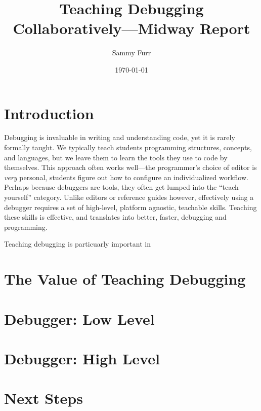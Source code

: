 \documentclass[12pt, twocolumn]{article}
\author{Sammy Furr}
\title{Teaching Debugging Collaboratively---Midway Report}
\date{\today}
\begin{document}
\begin{titlepage}
\maketitle
\end{titlepage}

\section{Introduction}

Debugging is invaluable in writing and understanding code, yet it is
rarely formally taught.  We typically teach students programming
structures, concepts, and languages, but we leave them to learn the
tools they use to code by themselves.  This approach often works
well---the programmer's choice of editor is \textit{very} personal,
students figure out how to configure an individualized workflow.
Perhaps because debuggers are tools, they often get lumped into the
``teach yourself'' category.  Unlike editors or reference guides
however, effectively using a debugger requires a set of high-level,
platform agnostic, teachable skills.  Teaching these skills is
effective, and translates into better, faster, debugging and
programming.\cite{10.1145/3286960.3286970}\cite{10.1145/3361721.3361724}\par

Teaching debugging is particuarly important in 

\section{The Value of Teaching Debugging}

\section{Debugger: Low Level}

\section{Debugger: High Level}

\section{Next Steps}

\pagebreak

{}
\end{document}
